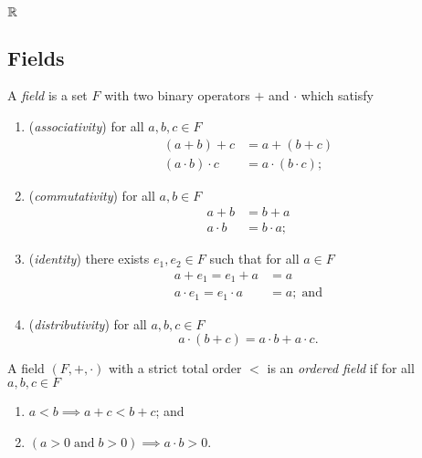
\section{$\mathbb{R}$}
\subsection{Fields}

\begin{definition}[Field]
	A \emph{field} is a set $F$ with two binary operators $+$ and $\cdot$ which
	satisfy
	\begin{enumerate}
		\item (\emph{associativity}) for all $a, b, c \in F$
			\begin{align*}
				(a + b) + c &= a + (b + c) \\
				(a \cdot b) \cdot c &= a \cdot (b \cdot c);
			\end{align*}

		\item (\emph{commutativity}) for all $a, b \in F$
			\begin{align*}
				a + b &= b + a \\
				a \cdot b &= b \cdot a;
			\end{align*}
			
		\item (\emph{identity}) there exists $e_1, e_2 \in F$ such that
			for all $a \in F$
			\begin{align*}
				a + e_1 = e_1 + a &= a \\
				a \cdot e_1 = e_1 \cdot a &= a; \;\text{and}
			\end{align*}
		
		\item (\emph{distributivity}) for all $a, b, c \in F$
			\[
				a \cdot (b + c) = a \cdot b + a \cdot c.
			\]
	\end{enumerate}
\end{definition}

\begin{definition}
	\label{def:ordered-field-total-order}
	A field $(F, +, \cdot)$ with a strict total order $<$ is an
	\emph{ordered field} if for all $a, b, c \in F$
	\begin{enumerate}
		\item $a < b \implies a + c < b + c$; and
		\item $(a > 0 \;\text{and}\; b > 0) \implies a \cdot b > 0$.
	\end{enumerate}
\end{definition}

